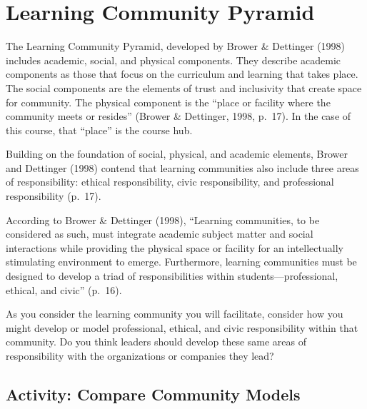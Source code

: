 \documentclass[
]{book}
\begin{document}
\hypertarget{learning-community-pyramid}{%
\section{Learning Community Pyramid}\label{learning-community-pyramid}}

The Learning Community Pyramid, developed by Brower \& Dettinger (1998) includes academic, social, and physical components. They describe academic components as those that focus on the curriculum and learning that takes place. The social components are the elements of trust and inclusivity that create space for community. The physical component is the ``place or facility where the community meets or resides'' (Brower \& Dettinger, 1998, p.~17). In the case of this course, that ``place'' is the course hub.

Building on the foundation of social, physical, and academic elements, Brower and Dettinger (1998) contend that learning communities also include three areas of responsibility: ethical responsibility, civic responsibility, and professional responsibility (p.~17).

According to Brower \& Dettinger (1998), ``Learning communities, to be considered as such, must integrate academic subject matter and social interactions while providing the physical space or facility for an intellectually stimulating environment to emerge. Furthermore, learning communities must be designed to develop a triad of responsibilities within students---professional, ethical, and civic'' (p.~16).

As you consider the learning community you will facilitate, consider how you might develop or model professional, ethical, and civic responsibility within that community. Do you think leaders should develop these same areas of responsibility with the organizations or companies they lead?

\hypertarget{activity-compare-community-models}{%
\subsection{Activity: Compare Community Models}\label{activity-compare-community-models}}
\end{document}
